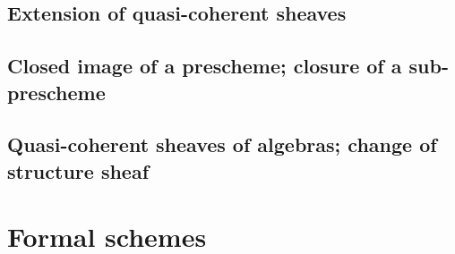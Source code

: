 \documentclass[10pt,oneside]{amsart}
\begin{document}
        \subsection{Extension of quasi-coherent sheaves}
        
        
        \subsection{Closed image of a prescheme; closure of a sub-prescheme}
        
        
        \subsection{Quasi-coherent sheaves of algebras; change of structure sheaf}
        
        

    \section{Formal schemes}

\clearpage
\end{document}
